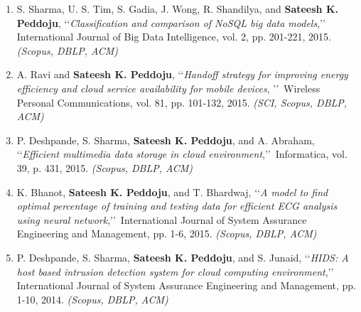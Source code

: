 \begin{enumerate}[label=(J\arabic*)]
	\item
	S. Sharma, U. S. Tim, S. Gadia, J. Wong, R. Shandilya, and \textbf{Sateesh K. Peddoju}, \lq\lq \textit{Classification and comparison of NoSQL big data models},\rq\rq\, International Journal of Big Data Intelligence, vol. 2, pp. 201-221, 2015. \emph{(Scopus, DBLP, ACM)}
	
	
	\item
	A. Ravi and \textbf{Sateesh K. Peddoju}, \lq\lq \textit{Handoff strategy for improving energy efficiency and cloud service availability for mobile devices}, \rq\rq\, Wireless Personal Communications, vol. 81, pp. 101-132, 2015. \emph{(SCI, Scopus, DBLP, ACM)}
	
	
	\item
	P. Deshpande, S. Sharma, \textbf{Sateesh K. Peddoju}, and A. Abraham, \lq\lq \textit{Efficient multimedia data storage in cloud environment},\rq\rq\, Informatica, vol. 39, p. 431, 2015. \emph{(Scopus, DBLP, ACM)}
	
	\item
	K. Bhanot, \textbf{Sateesh K. Peddoju}, and T. Bhardwaj, \lq\lq \textit{A model to find optimal percentage of training and testing data for efficient ECG analysis using neural network},\rq\rq\, International Journal of System Assurance Engineering and Management, pp. 1-6, 2015. \emph{(Scopus, DBLP, ACM)}
	
	\item
	P. Deshpande, S. Sharma, \textbf{Sateesh K. Peddoju}, and S. Junaid, \lq\lq \textit{HIDS: A host based intrusion detection system for cloud computing environment},\rq\rq\, International Journal of System Assurance Engineering and Management, pp. 1-10, 2014. \emph{(Scopus, DBLP, ACM)}
	
	
	
	
\end{enumerate}		